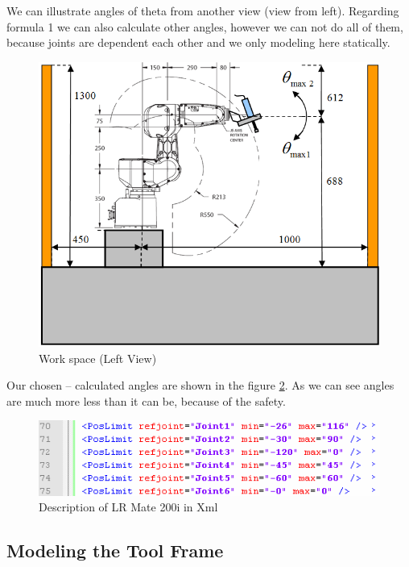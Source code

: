 We can illustrate angles of theta from another view (view from left). Regarding formula 1 we can also calculate other angles, however we can not do all of them, because joints are dependent each other and we only modeling here statically. 

\begin{figure}[H]
  \centering
  \includegraphics[scale= 0.6]{source/JointWorkspace.png}
  \caption{Work space (Left View)}
  \label{fig:JointWorkspace}
\end{figure}

Our chosen – calculated angles are shown in the figure \ref{fig:angleXML}. As we can see angles are much more less than it can be, because of the safety. 

\begin{figure}[H]
  \centering
  \includegraphics[scale= 0.8]{source/angleXML.png}
  \caption{Description of LR Mate 200i in Xml}
  \label{fig:angleXML}
\end{figure}

\subsection {Modeling the Tool Frame}

